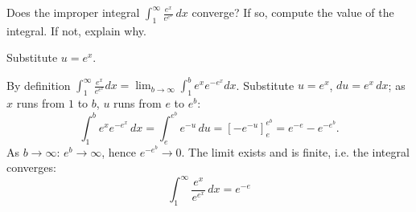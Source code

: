 
\begin{question}
Does the improper integral $\displaystyle\int_1^\infty\frac{e^x}{e^{e^x}}\,dx$ converge? If so, compute the value of the integral. If not, explain why.
\end{question}

\begin{hint}
Substitute $u=e^x$.
\end{hint}

\begin{solution}
By definition $\int_1^\infty\frac{e^x}{e^{e^x}}dx=\lim_{b\to\infty}\int_1^b e^xe^{-e^x}dx$. Substitute $u=e^x$, $du=e^x\,dx$; as $x$ runs from $1$ to $b$, $u$ runs from $e$ to $e^b$:
\[ \int_1^b e^xe^{-e^x}\,dx=\int_e^{e^b}e^{-u}\,du=\left[-e^{-u}\right]_e^{e^b}=e^{-e}-e^{-e^b}. \]
As $b\to\infty$: $e^b\to\infty$, hence $e^{-e^b}\to0$. The limit exists and is finite, i.e. the integral converges:
\[ \boxed{\int_1^\infty\frac{e^x}{e^{e^x}}\,dx=e^{-e}} \]
\end{solution}
